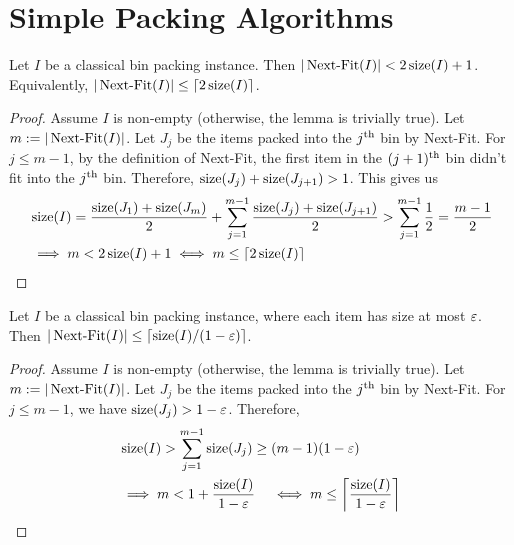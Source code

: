 \section{Simple Packing Algorithms}
\label{sec:preliminaries:simple-algos}

\begin{lemma}
\label{thm:next-fit}
Let $I$ be a classical bin packing instance. Then
$|\operatorname{Next-Fit}(I)| < 2\operatorname{size}(I) + 1$.
Equivalently, $|\operatorname{Next-Fit}(I)| \le \left\lceil 2\operatorname{size}(I) \right\rceil$.
\end{lemma}
\begin{proof}
Assume $I$ is non-empty (otherwise, the lemma is trivially true).
Let $m := |\operatorname{Next-Fit}(I)|$.
Let $J_j$ be the items packed into the $j^{\textrm{th}}$ bin by Next-Fit.
For $j \le m-1$, by the definition of Next-Fit,
the first item in the $(j+1)^{\textrm{th}}$ bin didn't fit into the $j^{\textrm{th}}$ bin.
Therefore, $\operatorname{size}(J_j) + \operatorname{size}(J_{j+1}) > 1$. This gives us
\begin{align*}
& \operatorname{size}(I)
= \frac{\operatorname{size}(J_1) + \operatorname{size}(J_m)}{2} + \sum_{j=1}^{m-1} \frac{\operatorname{size}(J_j) + \operatorname{size}(J_{j+1})}{2}
> \sum_{j=1}^{m-1} \frac{1}{2} = \frac{m-1}{2}
\\ &\implies m < 2\operatorname{size}(I) + 1 \iff m \le \left\lceil 2\operatorname{size}(I) \right\rceil  \qedhere
\end{align*}
\end{proof}

\begin{lemma}
\label{thm:next-fit-small}
Let $I$ be a classical bin packing instance, where each item has size at most $\varepsilon$. Then
$|\operatorname{Next-Fit}(I)| \le \left\lceil \operatorname{size}(I)/(1-\varepsilon) \right\rceil$.
\end{lemma}
\begin{proof}
Assume $I$ is non-empty (otherwise, the lemma is trivially true).
Let $m := |\operatorname{Next-Fit}(I)|$.
Let $J_j$ be the items packed into the $j^{\textrm{th}}$ bin by Next-Fit.
For $j \le m-1$, we have $\operatorname{size}(J_j) > 1-\varepsilon$.
Therefore,
\begin{align*}
& \operatorname{size}(I) > \sum_{j=1}^{m-1} \operatorname{size}(J_j) \ge (m-1)(1-\varepsilon)
\\ &\implies m < 1 + \frac{\operatorname{size}(I)}{1-\varepsilon}
\quad\iff m \le \left\lceil \frac{\operatorname{size}(I)}{1-\varepsilon} \right\rceil
\qedhere \end{align*}
\end{proof}

